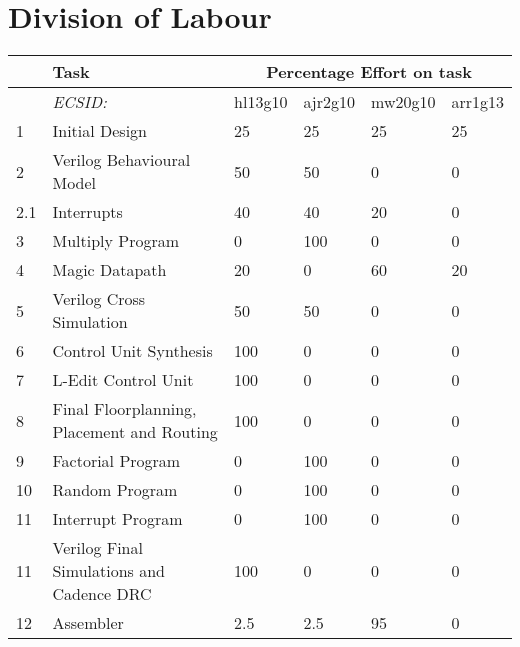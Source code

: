

\chapter{Division of Labour}\label{ch:dol}


\begin{table}[!h]
\begin{tabular}{p{0.8cm}p{\textwidth-10.2cm}p{1.7cm}p{1.7cm}p{1.7cm}p{1.7cm}}
     & Task             & \multicolumn{4}{c}{Percentage Effort on task} \\ \hline
     &  \textit{ECSID:}					& hl13g10 & ajr2g10 & mw20g10 & arr1g13 \\ \hline
1    & Initial Design					& 25	& 25	& 25 	& 25 \\ \hline 
2    & Verilog Behavioural Model			& 50	& 50	& 0 	& 0 \\ \hline 
2.1  & Interrupts 					& 40	& 40 	& 20 	& 0 \\ 
3    & Multiply Program					& 0	& 100	& 0 	& 0 \\ \hline 
4    & Magic Datapath					& 20	& 0	& 60 	& 20 \\ 
5    & Verilog Cross Simulation				& 50	& 50	& 0 	& 0 \\ \hline 
6    & Control Unit Synthesis				& 100	& 0	& 0 	& 0 \\ \hline 
7    & L-Edit Control Unit				& 100	& 0	& 0 	& 0 \\ \hline 
8    & Final Floorplanning, Placement and Routing	& 100	& 0	& 0 	& 0 \\ \hline 
9    & Factorial Program				& 0	& 100	& 0 	& 0 \\ \hline 
10   & Random Program					& 0	& 100	& 0 	& 0 \\ \hline 
11   & Interrupt Program				& 0	& 100	& 0 	& 0 \\ \hline 
11   & Verilog Final Simulations and Cadence DRC	& 100	& 0	& 0 	& 0 \\ \hline 
12   & Assembler					& 2.5	& 2.5	& 95 	& 0 \\ \hline 

\end{tabular}
\end{table}
